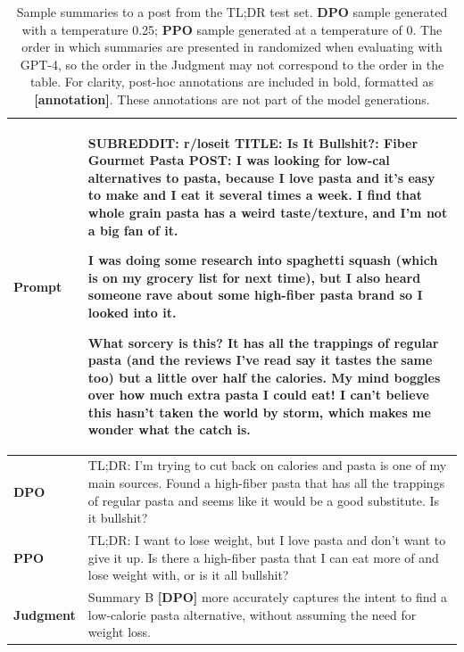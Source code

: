 \documentclass{article}
\begin{document}
\begin{table}
    \centering
    \begin{tabular}{lp{11.5cm}}
        \toprule
        \textbf{Prompt} & SUBREDDIT: r/loseit
        TITLE: Is It Bullshit?: Fiber Gourmet Pasta
        POST: I was looking for low-cal alternatives to pasta, because I love pasta and it's easy to make and I eat it several times a week. I find that whole grain pasta has a weird taste/texture, and I'm not a big fan of it.

        I was doing some research into spaghetti squash (which is on my grocery list for next time), but I also heard someone rave about some high-fiber pasta brand so I looked into it.

        What sorcery is this? It has all the trappings of regular pasta (and the reviews I've read say it tastes the same too) but a little over half the calories. My mind boggles over how much extra pasta I could eat! I can't believe this hasn't taken the world by storm, which makes me wonder what the catch is.
         \\
        \midrule
        \textbf{DPO} & TL;DR: I'm trying to cut back on calories and pasta is one of my main sources. Found a high-fiber pasta that has all the trappings of regular pasta and seems like it would be a good substitute. Is it bullshit?\\
        \midrule
        \textbf{PPO} & TL;DR: I want to lose weight, but I love pasta and don't want to give it up. Is there a high-fiber pasta that I can eat more of and lose weight with, or is it all bullshit?\\
        \midrule
        \textbf{Judgment} & Summary B \textbf{[DPO]} more accurately captures the intent to find a low-calorie pasta alternative, without assuming the need for weight loss. \\
        \bottomrule
    \end{tabular}
    \vspace{4mm}
    \caption{Sample summaries to a post from the TL;DR test set. \textbf{DPO} sample generated with a temperature 0.25; \textbf{PPO} sample generated at a temperature of 0. The order in which summaries are presented in randomized when evaluating with GPT-4, so the order in the Judgment may not correspond to the order in the table. For clarity, post-hoc annotations are included in bold, formatted as \textbf{[annotation]}. These annotations are not part of the model generations.}
    \label{tab:summ-ex-3}
\end{table}
\end{document}
